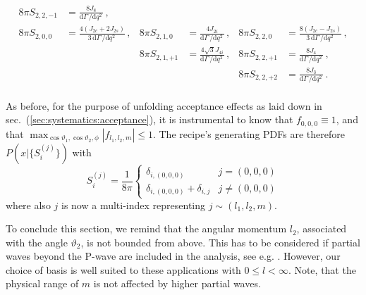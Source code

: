 \documentclass[aps,nofootinbib,preprintnumbers,prd,twocolumn]{revtex4-1}
\newcommand{\refsec}[1]{sec.~(\ref{sec:#1})}
\newcommand{\rmdx}[1]{\mbox{d} #1 \,} %
\renewcommand{\theta}{\vartheta}
\begin{document}
\begin{widetext}
\begin{equation}
\begin{aligned}
    8\pi S_{2, 2, -1} & = \frac{8 J_8}{\rmdx{\Gamma}/\rmdx{q^2}}\,,                                        \\
%
    8\pi S_{2, 0,  0} & = \frac{4 (J_{2c} + 2 J_{2s})}{3\, \rmdx{\Gamma}/\rmdx{q^2}}\,,                    &
    8\pi S_{2, 1,  0} & = \frac{4 J_{2i}}{\rmdx{\Gamma}/\rmdx{q^2}}\,,                                     &
    8\pi S_{2, 2,  0} & = \frac{8 (J_{2c} - J_{2s})}{3\, \rmdx{\Gamma}/\rmdx{q^2}}\,,                      \\
%
                      &                                                                                    &
    8\pi S_{2, 1, +1} & = \frac{4\sqrt{3} J_{4i}}{\rmdx{\Gamma}/\rmdx{q^2}}\,,                             &
    8\pi S_{2, 2, +1} & = \frac{8 J_{4}}{\rmdx{\Gamma}/\rmdx{q^2}}\,,                                      \\
%
                      &                                                                                    &
                      &                                                                                    &
    8\pi S_{2, 2, +2} & = \frac{8 J_3}{\rmdx{\Gamma}/\rmdx{q^2}}\,.                                        \\
\end{aligned}
\end{equation}
\end{widetext}

As before, for the purpose of unfolding acceptance effects as laid down in \refsec{systematics:acceptance}, it is instrumental
to know that $f_{0,0,0} \equiv 1$, and that $\max_{\cos\theta_1,\cos\theta_2,\phi} |f_{l_1, l_2, m}| \leq 1$.
The recipe's generating PDFs are therefore $P(x|\lbrace S_i^{(j)}\rbrace)$ with
\begin{equation}
    \label{eq:recipe:btokstarll}
    S_i^{(j)} = \frac{1}{8\pi}
        \begin{cases}
            \delta_{i,(0,0,0)}                  & j = (0, 0, 0)\\
            \delta_{i,(0,0,0)}  + \delta_{i,j}  & j \neq (0, 0, 0)
        \end{cases}
\end{equation}
where also $j$ is now a multi-index representing $j \sim (l_1, l_2, m)$.

To conclude this section, we remind that the angular momentum $l_2$, associated with the angle $\theta_2$, is not bounded from above.
This has to be considered if partial waves beyond the P-wave are included in the analysis, see e.g. \cite{Das:2014sra}.
However, our choice of basis is well suited to these applications with $0 \leq l < \infty$. Note, that the
physical range of $m$ is not affected by higher partial waves.
\end{document}
